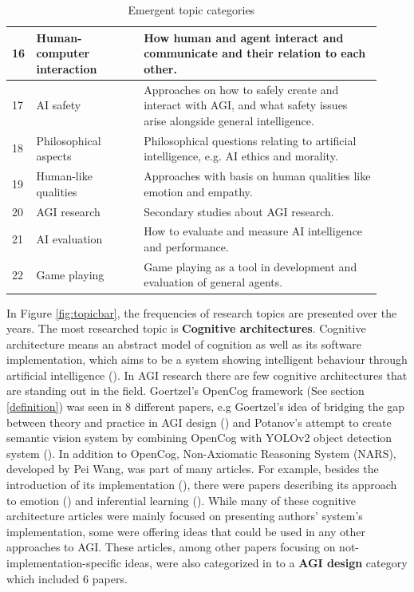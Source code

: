 \begin{table}[H]
\begin{tabular}{p{0.02\linewidth} p{0.28\linewidth} p{0.62\linewidth}}
    16 & Human-computer interaction & How human and agent interact and communicate and their relation to each other.\\ \hline
    17 & AI safety & Approaches on how to safely create and interact with AGI, and what safety issues arise alongside general intelligence.\\ \hline
    18 & Philosophical aspects & Philosophical questions relating to artificial intelligence, e.g. AI ethics and morality.\\ \hline
    19 & Human-like qualities & Approaches with basis on human qualities like emotion and empathy.\\ \hline
    20 & AGI research & Secondary studies about AGI research. \\ \hline
    21 & AI evaluation & How to evaluate and measure AI intelligence and performance.\\ \hline
    22 & Game playing  & Game playing as a tool in development and evaluation of general agents.\\ \hline

  \end{tabular}
  \caption{Emergent topic categories}
  \label{table:topicdescription}
\end{table}


In Figure \ref*{fig:topicbar}, the frequencies of research topics are presented
over the years. The most researched topic is \textbf{Cognitive architectures}.
Cognitive architecture means an abstract model of cognition as well as its
software implementation, which aims to be a system showing intelligent behaviour
through artificial intelligence (\cite{lieto2018}). In AGI research there are
few cognitive architectures that are standing out in the field. Goertzel's
OpenCog framework (See section \ref*{definition}) was seen in 8 different
papers, e.g Goertzel's idea of bridging the gap between theory and practice in
AGI design (\cite{goertzel2017agents}) and Potanov's attempt to create semantic
vision system by combining OpenCog with YOLOv2 object detection system
(\cite{potapov2018}). In addition to OpenCog, Non-Axiomatic Reasoning System
(NARS), developed by Pei Wang, was part of many articles. For example, besides
the introduction of its implementation (\cite{hammer2016opennars}), there were
papers describing its approach to emotion (\cite{wang2016emotional}) and
inferential learning (\cite{wang2016learning}). While many of these cognitive
architecture articles were mainly focused on presenting authors' system's
implementation, some were offering ideas that could be used in any other
approaches to AGI. These articles, among other papers focusing on
not-implementation-specific ideas, were also categorized in to a \textbf{AGI
design} category which included 6 papers.

